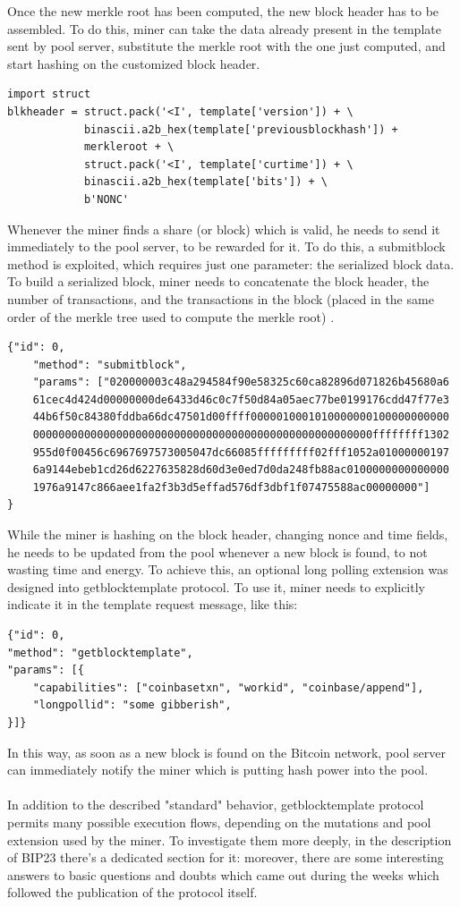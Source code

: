 Once the new merkle root has been computed, the new block header has to be assembled. To do this, miner can take the data already present in the template sent by pool server, substitute the merkle root with the one just computed, and start hashing on the customized block header.
\begin{lstlisting}[style=pythonStyle, numbers=none]
import struct
blkheader = struct.pack('<I', template['version']) + \
            binascii.a2b_hex(template['previousblockhash']) +
            merkleroot + \
            struct.pack('<I', template['curtime']) + \
            binascii.a2b_hex(template['bits']) + \
            b'NONC'
\end{lstlisting}
\medskip
Whenever the miner finds a share (or block) which is valid, he needs to send it immediately to the pool server, to be rewarded for it. To do this, a submitblock method is exploited, which requires just one parameter: the serialized block data.\\
To build a serialized block, miner needs to concatenate the block header, the number of transactions, and the transactions in the block (placed in the same order of the merkle tree used to compute the merkle root) \cite{bitcoinBlockChain}.
\begin{verbatim}
{"id": 0, 
    "method": "submitblock", 
    "params": ["020000003c48a294584f90e58325c60ca82896d071826b45680a6
    61cec4d424d00000000de6433d46c0c7f50d84a05aec77be0199176cdd47f77e3
    44b6f50c84380fddba66dc47501d00ffff0000010001010000000100000000000
    00000000000000000000000000000000000000000000000000000ffffffff1302
    955d0f00456c6967697573005047dc66085fffffffff02fff1052a01000000197
    6a9144ebeb1cd26d6227635828d60d3e0ed7d0da248fb88ac0100000000000000
    1976a9147c866aee1fa2f3b3d5effad576df3dbf1f07475588ac00000000"]
}
\end{verbatim}
\medskip
While the miner is hashing on the block header, changing nonce and time fields, he needs to be updated from the pool whenever a new block is found, to not wasting time and energy.
To achieve this, an optional long polling extension was designed into getblocktemplate protocol.
To use it, miner needs to explicitly indicate it in the template request message, like this:
\begin{verbatim}
{"id": 0, 
"method": "getblocktemplate", 
"params": [{
    "capabilities": ["coinbasetxn", "workid", "coinbase/append"],
    "longpollid": "some gibberish",
}]}
\end{verbatim}
In this way, as soon as a new block is found on the Bitcoin network, pool server can immediately notify the miner which is putting hash power into the pool.\\\\
In addition to the described "standard" behavior, getblocktemplate protocol permits many possible execution flows, depending on the mutations and pool extension used by the miner.
To investigate them more deeply, in the description of BIP23 there's a dedicated section for it: moreover, there are some interesting answers to basic questions and doubts which came out during the weeks which followed the publication of the protocol itself.
